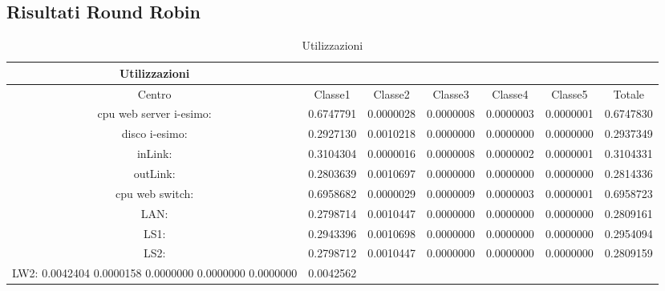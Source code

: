 \subsection{Risultati Round Robin}
\begin{table}[htbp]
\begin{center}
\begin{tabular}{||c|c|c|c|c|c|c||}
\hline
Utilizzazioni\\
\hline
Centro &Classe1 &Classe2 &Classe3 &Classe4 &Classe5 &Totale\\
\hline
\hline
 cpu web server i-esimo: 	&0.6747791	&0.0000028	&0.0000008	&0.0000003	&0.0000001	&0.6747830\\
\hline
 disco i-esimo: 	&0.2927130	&0.0010218	&0.0000000	&0.0000000	&0.0000000	&0.2937349\\
\hline
 inLink: 	&0.3104304	&0.0000016	&0.0000008	&0.0000002	&0.0000001	&0.3104331\\
\hline
 outLink: 	&0.2803639	&0.0010697	&0.0000000	&0.0000000	&0.0000000	&0.2814336\\
\hline
 cpu web switch: 	&0.6958682	&0.0000029	&0.0000009	&0.0000003	&0.0000001	&0.6958723\\
\hline
 LAN: 	&0.2798714	&0.0010447	&0.0000000	&0.0000000	&0.0000000	&0.2809161\\
\hline
 LS1: 	&0.2943396	&0.0010698	&0.0000000	&0.0000000	&0.0000000	&0.2954094\\
\hline
 LS2:	&0.2798712	&0.0010447	&0.0000000	&0.0000000	&0.0000000	&0.2809159\\
\hline
 LW2: 	0.0042404	0.0000158	0.0000000	0.0000000	0.0000000	&0.0042562\\
\hline
\end{tabular}
\end{center}
\caption{Utilizzazioni}
\label{utilizzazioni}
\end{table}

